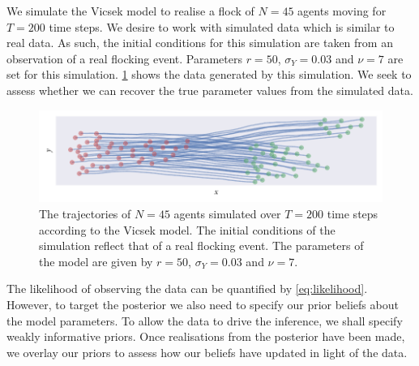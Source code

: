 We simulate the Vicsek model to realise a flock of $N=45$ agents moving for $T=200$ time
steps. We desire to work with simulated data which is similar to real data. As such, the
initial conditions for this simulation are taken from an observation of a real flocking
event. Parameters $r=50$, $\sigma_Y=0.03$ and $\nu=7$ are set for this simulation.
\cref{fig:vicsek_sim} shows the data generated by this simulation. We seek to assess
whether we can recover the true parameter values from the simulated data.

\begin{figure}[tbp]
  \includegraphics{vicsek_sim.pdf}
  \caption{The trajectories of $N=45$ agents simulated over $T=200$ time steps according to
    the Vicsek model. The initial conditions of the simulation reflect that of a real
    flocking event. The parameters of the model are given by $r=50$, $\sigma_Y=0.03$ and
    $\nu=7$.}
  \label{fig:vicsek_sim}
\end{figure}

The likelihood of observing the data can be quantified by \cref{eq:likelihood}. However,
to target the posterior we also need to specify our prior beliefs about the model
parameters. To allow the data to drive the inference, we shall specify weakly informative
priors. Once realisations from the posterior have been made, we overlay our priors to
assess how our beliefs have updated in light of the data.

